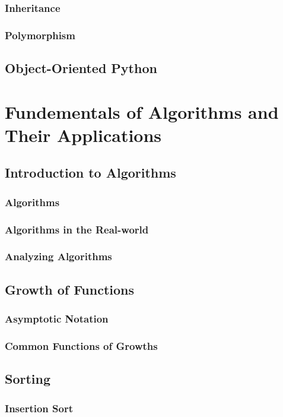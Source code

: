 \documentclass{concrete-book}
\begin{document}
\section{Inheritance}
\section{Polymorphism}

\chapter{Object-Oriented Python}

\part{Fundementals of Algorithms and Their Applications}

\chapter{Introduction to Algorithms}
\section{Algorithms}
\section{Algorithms in the Real-world}
\section{Analyzing Algorithms}

\chapter{Growth of Functions}
\section{Asymptotic Notation}
\section{Common Functions of Growths}

\chapter{Sorting}
\section{Insertion Sort}
\end{document}
